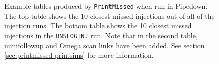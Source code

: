 \begin{figure}[p]
\center
{}
\label{fig:sample-printmissed}
\caption{Example tables produced by \texttt{PrintMissed} when run in Pipedown.
The top table shows the 10 closest missed injections out of all of the
injection runs. The bottom table shows the 10 closest missed injections in the
\texttt{BNSLOGINJ} run. Note that in the second table, minifollowup and Omega
scan links have been added. See section \ref{sec:printmissed-printsims} for
more information.}
\end{figure}

